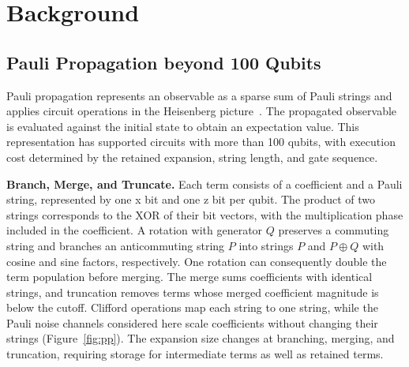 \section{Background}
\label{sec:background}

\subsection{Pauli Propagation beyond 100 Qubits}
Pauli propagation represents an observable as a sparse sum of Pauli strings and applies circuit operations in the Heisenberg picture~\cite{begusic2024fast,rudolph2025pauli}.
The propagated observable is evaluated against the initial state to obtain an expectation value.
This representation has supported circuits with more than 100 qubits, with execution cost determined by the retained expansion, string length, and gate sequence.

\noindent\textbf{Branch, Merge, and Truncate.}
Each term consists of a coefficient and a Pauli string, represented by one x bit and one z bit per qubit.
The product of two strings corresponds to the XOR of their bit vectors, with the multiplication phase included in the coefficient.
A rotation with generator $Q$ preserves a commuting string and branches an anticommuting string $P$ into strings $P$ and $P\oplus Q$ with cosine and sine factors, respectively.
One rotation can consequently double the term population before merging.
The merge sums coefficients with identical strings, and truncation removes terms whose merged coefficient magnitude is below the cutoff.
Clifford operations map each string to one string, while the Pauli noise channels considered here scale coefficients without changing their strings (Figure~\ref{fig:pp}).
The expansion size changes at branching, merging, and truncation, requiring storage for intermediate terms as well as retained terms.

